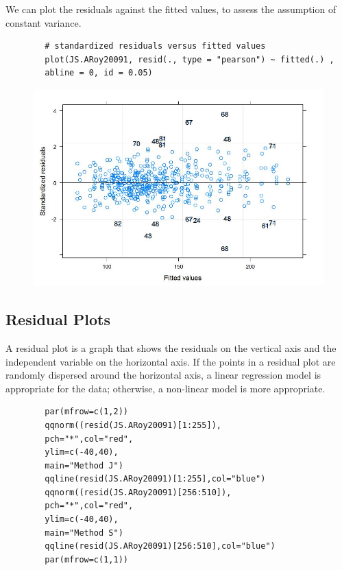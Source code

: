 \documentclass[12pt, a4paper]{report}
\theoremstyle{plain}
\theoremstyle{definition}
\theoremstyle{remark}
\begin{document}
	We can plot the residuals against the fitted values, to assess the assumption of constant variance. 
	\begin{framed}
		\begin{verbatim}
		# standardized residuals versus fitted values 
		plot(JS.ARoy20091, resid(., type = "pearson") ~ fitted(.) , 
		abline = 0, id = 0.05)
		\end{verbatim}
	\end{framed}
	\begin{figure}[h!]
		\centering
		\includegraphics[width=0.9\linewidth]{images/Residuals-JS-roy}
		\caption{}
		\label{fig:Residuals-JS-ARoy2009}
	\end{figure}
	\subsection{Residual Plots}
	A residual plot is a graph that shows the residuals on the vertical axis and the independent variable on the horizontal axis. If the points in a residual plot are randomly dispersed around the horizontal axis, a linear regression model is appropriate for the data; otherwise, a non-linear model is more appropriate.
	
	\begin{framed}
		\begin{verbatim}
		par(mfrow=c(1,2))
		qqnorm((resid(JS.ARoy20091)[1:255]),
		pch="*",col="red",
		ylim=c(-40,40),
		main="Method J")
		qqline(resid(JS.ARoy20091)[1:255],col="blue")
		qqnorm((resid(JS.ARoy20091)[256:510]),
		pch="*",col="red",
		ylim=c(-40,40),
		main="Method S")
		qqline(resid(JS.ARoy20091)[256:510],col="blue")
		par(mfrow=c(1,1))
		\end{verbatim}	
	\end{framed}
	
\end{document}

